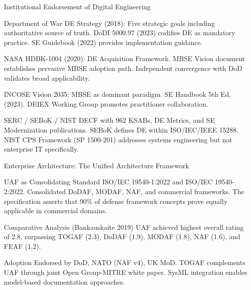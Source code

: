 \documentclass{beamer}
\begin{document}
\begin{frame}[allowframebreaks]{Institutional Endorsement of Digital Engineering}
  \begin{block}{Department of War}
    DE Strategy (2018): Five strategic goals including authoritative source of truth. DoDI 5000.97 (2023) codifies DE as mandatory practice. SE Guidebook (2022) provides implementation guidance.
  \end{block}

  \begin{block}{NASA}
    HDBK-1004 (2020): DE Acquisition Framework. MBSE Vision document establishes pervasive MBSE adoption path. Independent convergence with DoD validates broad applicability.
  \end{block}

  \begin{block}{INCOSE}
    Vision 2035: MBSE as dominant paradigm. SE Handbook 5th Ed. (2023). DEIEX Working Group promotes practitioner collaboration.
  \end{block}

  \begin{block}{SERC / SEBoK / NIST}
    DECF with 962 KSABs, DE Metrics, and SE Modernization publications. SEBoK defines DE within ISO/IEC/IEEE 15288. NIST CPS Framework (SP 1500-201) addresses systems engineering but not enterprise IT specifically.
  \end{block}
\end{frame}

\begin{frame}[allowframebreaks]{Enterprise Architecture: The Unified Architecture Framework}
  \begin{block}{UAF as Consolidating Standard}
    ISO/IEC 19540-1:2022 and ISO/IEC 19540-2:2022. Consolidated DoDAF, MODAF, NAF, and commercial frameworks. The specification asserts that 90\% of defense framework concepts prove equally applicable in commercial domains.
  \end{block}

  \begin{block}{Comparative Analysis (Bankauskaite 2019)}
    UAF achieved highest overall rating of 2.8, surpassing TOGAF (2.3), DoDAF (1.9), MODAF (1.8), NAF (1.6), and FEAF (1.2).
  \end{block}

  \begin{block}{Adoption}
    Endorsed by DoD, NATO (NAF v4), UK MoD. TOGAF complements UAF through joint Open Group-MITRE white paper. SysML integration enables model-based documentation approaches.
  \end{block}
\end{frame}
\end{document}
